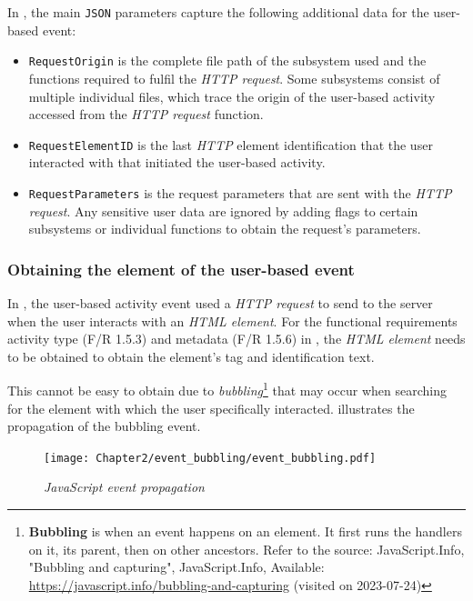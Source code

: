 In , the main \texttt{JSON} parameters capture the following additional data for the user-based event:

\begin{itemize}
	\item \texttt{RequestOrigin} is the complete file path of the subsystem used and the functions required to fulfil the \textit{HTTP request}. Some subsystems consist of multiple individual files, which trace the origin of the user-based activity accessed from the \textit{HTTP request} function.
	\item \texttt{RequestElementID} is the last \textit{HTTP} element identification that the user interacted with that initiated the user-based activity.
	\item \texttt{RequestParameters} is the request parameters that are sent with the \textit{HTTP request}. Any sensitive user data are ignored by adding flags to certain subsystems or individual functions to obtain the request's parameters.
\end{itemize}

\subsubsection{Obtaining the element of the user-based event}\label{sec:ch3_ElementObtaining}
In , the user-based activity event used a \textit{HTTP request} to send to the server when the user interacts with an \textit{HTML element}. For the functional requirements activity type (F/R 1.5.3) and metadata (F/R 1.5.6) in , the \textit{HTML element} needs to be obtained to obtain the element's tag and identification text.

\clearpage

This cannot be easy to obtain due to \textit{bubbling}\footnote{\textbf{Bubbling} is when an event happens on an element. It first runs the handlers on it, its parent, then on other ancestors. Refer to the source: JavaScript.Info, "Bubbling and capturing", JavaScript.Info, Available: \url{https://javascript.info/bubbling-and-capturing} (visited on 2023-07-24)} that may occur when searching for the element with which the user specifically interacted.  illustrates the propagation of the bubbling event.

\begin{figure}[!htb]
	\centering %
	\texttt{[image: Chapter2/event\_bubbling/event\_bubbling.pdf]}
	\caption[JavaScript event propagation]
	{\textit{JavaScript event propagation}}\label{fig:ch2_event_bubbling}
\end{figure}


